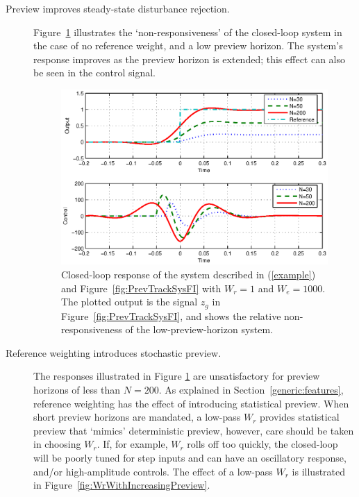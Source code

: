\begin{description}
\item[Preview improves steady-state disturbance rejection.] 
Figure~\ref{fig:BetterSSWithIncN} illustrates the `non-responsiveness' of the closed-loop system in the case of no reference weight, and a low preview horizon. The system's response improves as the preview horizon is extended; this effect can also be seen in the control signal.
\begin{figure}
\includegraphics[width=\columnwidth]{./diags/BetterSSwithIncN.eps}
\caption{Closed-loop response of the system described in (\ref{example}) and Figure~\ref{fig:PrevTrackSysFI} with $W_r=1$ and $W_e=1000$.
The plotted output is the signal $z_g$ in Figure~\ref{fig:PrevTrackSysFI}, and shows the relative non-responsiveness of the low-preview-horizon system.
\label{fig:BetterSSWithIncN}}
\end{figure}
\item[Reference weighting introduces stochastic preview.] 
The responses illustrated in Figure \ref{fig:BetterSSWithIncN} are unsatisfactory for preview horizons of less than $N=200$. As explained in Section~\ref{generic:features}, reference weighting has the effect of introducing statistical preview.  When short preview horizons are mandated, a low-pass $W_r$ provides statistical preview that `mimics' deterministic preview, however, care should be taken in choosing $W_r$.
If, for example, $W_r$ rolls off too quickly, the closed-loop will be poorly tuned for step inputs and can have an oscillatory response, and/or high-amplitude controls. The effect of a low-pass $W_r$ is illustrated in Figure~\ref{fig:WrWithIncreasingPreview}.
\begin{figure}

\end{figure}
\end{description}
